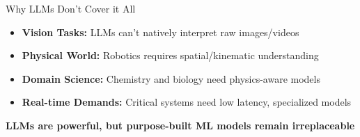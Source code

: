 \documentclass[aspectratio=169]{beamer}
\begin{document}
\begin{frame}{Why LLMs Don't Cover it All}
  \begin{itemize}
    \item \textbf{Vision Tasks:} LLMs can't natively interpret raw images/videos
    \item \textbf{Physical World:} Robotics requires
      spatial/kinematic understanding
    \item \textbf{Domain Science:} Chemistry and biology need
      physics-aware models
    \item \textbf{Real-time Demands:} Critical systems need low
      latency, specialized models
  \end{itemize}

  \vspace{0.5cm}
  \centering
  \textbf{LLMs are powerful, but purpose-built ML models remain irreplaceable}
\end{frame}
\end{document}
